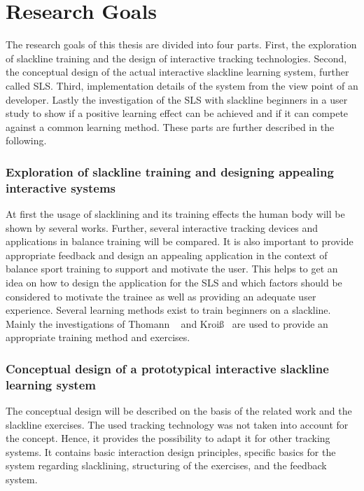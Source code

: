 \section{Research Goals}
The research goals of this thesis are divided into four parts. 
First, the exploration of slackline training and the design of interactive tracking technologies.
Second, the conceptual design of the actual interactive slackline learning system, further called SLS.
Third, implementation details of the system from the view point of an developer.
Lastly the investigation of the SLS with slackline beginners in a user study to show if a positive learning effect can be achieved and if it can compete against a common learning method.
These parts are further described in the following.

\subsubsection{Exploration of slackline training and designing appealing interactive systems}
At first the usage of slacklining and its training effects the human body will be shown by several works.
Further, several interactive tracking devices and applications in balance training will be compared.
It is also important to provide appropriate feedback and design an appealing application in the context of balance sport training to support and motivate the user.
This helps to get an idea on how to design the application for the SLS and which factors should be considered to motivate the trainee as well as providing an adequate user experience.
Several learning methods exist to train beginners on a slackline.
Mainly the investigations of Thomann ~\cite{Thomann2013-aa} and Kroiß~\cite{Kroiss2007-ab} are used to provide an appropriate training method and exercises. 

\subsubsection{Conceptual design of a prototypical interactive slackline learning system}
The conceptual design will be described on the basis of the related work and the slackline exercises.
The used tracking technology was not taken into account for the concept.
Hence, it provides the possibility to adapt it for other tracking systems.
It contains basic interaction design principles, specific basics for the system regarding slacklining, structuring of the exercises, and the feedback system.

